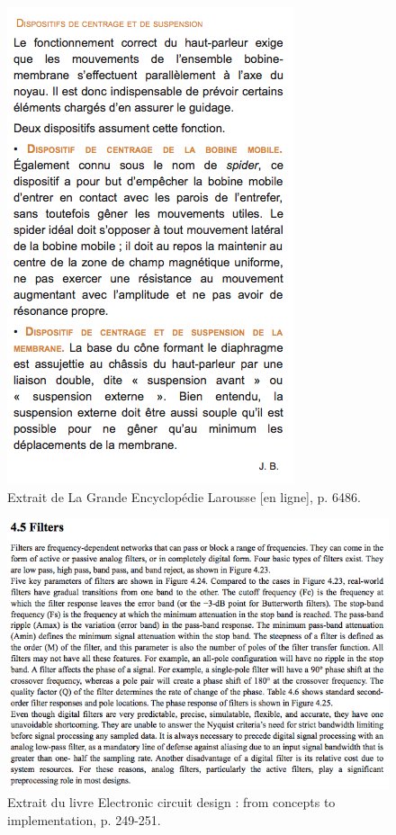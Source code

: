\begin{figure}[h]
\begin{center}
\includegraphics[scale = 0.5]{img/Larousse-1}
\end{center}
\caption{Extrait de \og La Grande Encyclopédie Larousse [en ligne]\fg, p. 6486.  \cite{Larousse}} %
\label{Trace 4}
\end{figure}

\begin{figure}[h]
\begin{center}
\includegraphics[scale=0.7]{img/Kularatna-1}
\end{center}
\caption{Extrait du livre \og Electronic circuit design : from concepts to implementation\fg, p. 249-251. \cite{Kularatna}} %
\label{Trace 5}
\end{figure}


